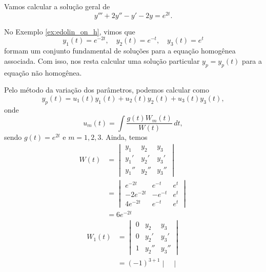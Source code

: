 \begin{ex}\label{ex:edlin_on_nh_vv}
  Vamos calcular a solução geral de
  \begin{equation}\label{eq:ex_edolin_on_nh_vv}
    y''' + 2y'' - y' - 2y = e^{2t}.
  \end{equation}

  No Exemplo \ref{ex:edolin_on_h}, vimos que
  \begin{equation}
    y_1(t) = e^{-2t},\quad y_2(t)=e^{-t},\quad y_3(t)=e^t
  \end{equation}
  formam um conjunto fundamental de soluções para a equação homogênea associada. Com isso, nos resta calcular uma solução particular $y_p=y_p(t)$ para a equação não homogênea.

  Pelo método da variação dos parâmetros, podemos calcular como
  \begin{equation}
    y_p(t) = u_1(t)y_1(t) + u_2(t)y_2(t) + u_3(t)y_3(t),
  \end{equation}
  onde
  \begin{equation}
    u_m(t) = \int \frac{g(t)W_m(t)}{W(t)}\,dt,
  \end{equation}
  sendo $g(t) = e^{2t}$ e $m=1,2,3$. Ainda, temos
  \begin{align}
    W(t) &=
           \begin{vmatrix}
             y_1 & y_2 & y_3 \\
             y_1' & y_2' & y_3' \\
             y_1'' & y_2'' & y_3''
           \end{vmatrix} \\
         &=
           \begin{vmatrix}
             e^{-2t} & e^{-t} & e^t \\
             -2e^{-2t} & -e^{-t} & e^t \\
             4e^{-2t} & e^{-t} & e^t
           \end{vmatrix} \\
         &= 6e^{-2t}
  \end{align}
  \begin{align}
    W_1(t) &=
           \begin{vmatrix}
             0 & y_2 & y_3 \\
             0 & y_2' & y_3' \\
             1 & y_2'' & y_3''
           \end{vmatrix} \\
           &= (-1)^{3+1}
             \begin{vmatrix}

\end{vmatrix}
\end{align}
\end{ex}
